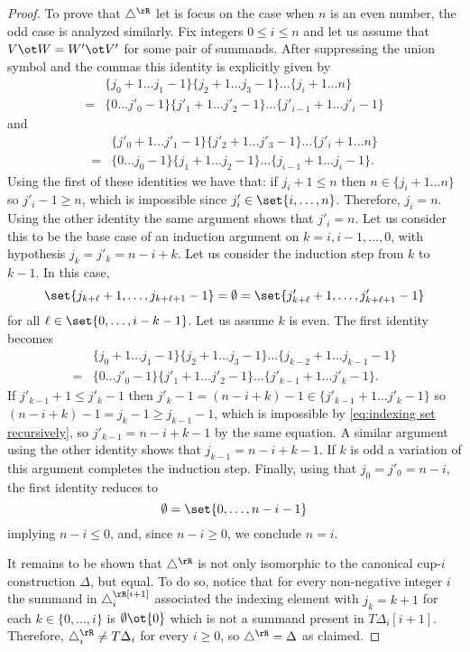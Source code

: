\begin{proof}
	To prove that $\triangle^\rR$ let is focus on the case when $n$ is an even number, the odd case is analyzed similarly.
	Fix integers $0 \leq i \leq n$ and let us assume that $V \ot W = W' \ot V'$ for some pair of summands.
	After suppressing the union symbol and the commas this identity is explicitly given by
	\begin{align*}
		&\{j_0+1 \dots j_1-1\} \{j_2+1 \dots j_3-1\} \dots \{j_i+1 \dots n\} \\=
		&\{0 \dots j'_0-1\} \{j'_1+1 \dots j'_2-1\} \dots \{j'_{i-1}+1 \dots j'_i-1\}
	\end{align*}
	and
	\begin{align*}
		&\{j'_0+1 \dots j'_1-1\} \{j'_2+1 \dots j'_3-1\} \dots \{j'_i+1 \dots n\} \\=
		&\{0 \dots j_0-1\} \{j_1+1 \dots j_2-1\} \dots \{j_{i-1}+1 \dots j_i-1\}.
	\end{align*}
	Using the first of these identities we have that: if $j_i+1 \leq n$ then $n \in \{j_i+1 \dots n\}$ so $j'_i-1 \geq n$, which is impossible since $j'_i \in \set{i,\dots,n}$.
	Therefore, $j_i = n$.
	Using the other identity the same argument shows that $j'_i = n$.
	Let us consider this to be the base case of an induction argument on $k = i,i-1,\dots,0$, with hypothesis $j_k = j'_k = n-i+k$.
	Let us consider the induction step from $k$ to $k-1$.
	In this case,
	\[
	\set{j_{k+\ell}+1,\dots,j_{k+\ell+1}-1} = \emptyset = \set{j'_{k+\ell}+1,\dots,j'_{k+\ell+1}-1}
	\]
	for all $\ell \in \set{0,\dots,i-k-1}$.
	Let us assume $k$ is even.
	The first identity becomes
	\begin{align*}
		&\{j_0+1 \dots j_1-1\} \{j_2+1 \dots j_3-1\} \dots \{j_{k-2}+1 \dots j_{k-1}-1\} \\=
		&\{0 \dots j'_0-1\} \{j'_1+1 \dots j'_2-1\} \dots \{j'_{k-1}+1 \dots j'_k-1\}.
	\end{align*}
	If $j'_{k-1}+1 \leq j'_k-1$ then $j'_k - 1 = (n-i+k) - 1 \in \{j'_{k-1}+1 \dots j'_k-1\}$ so $(n-i+k)-1 = j_k - 1 \geq j_{k-1}-1$, which is impossible by \cref{eq:indexing set recursively}, so $j'_{k-1} = n-i+k-1$ by the same equation.
	A similar argument using the other identity shows that $j_{k-1} = n-i+k-1$.
	If $k$ is odd a variation of this argument completes the induction step.
	Finally, using that $j_0 = j'_0 = n-i$, the first identity reduces to
	\[
	\emptyset = \set{0,\dots, n-i-1}
	\]
	implying $n-i \leq 0$, and, since $n-i \geq 0$, we conclude $n=i$.

	It remains to be shown that $\triangle^\rR$ is not only isomorphic to the canonical cup-$i$ construction $\Delta$, but equal.
	To do so, notice that for every non-negative integer $i$ the summand in $\triangle_i^\rR[i+1]$ associated the indexing element with $j_k = k+1$ for each $k \in \{0,\dots,i\}$ is $\emptyset \ot \{0\}$ which is not a summand present in $T \Delta_i[i+1]$.
	Therefore, $\triangle_i^\rR \neq T \Delta_i$ for every $i \geq 0$, so $\triangle^\rR = \Delta$ as claimed.
\end{proof}
